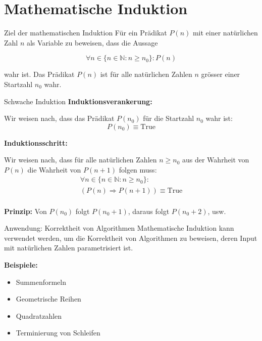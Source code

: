 \documentclass[a4paper, fontsize=7pt]{scrartcl}
\begin{document}
\section{Mathematische Induktion}

\begin{mainbox}{Ziel der mathematischen Induktion}
Für ein Prädikat $P(n)$ mit einer natürlichen Zahl $n$ als Variable zu beweisen, dass die Aussage

$$\forall n \in \{n \in \mathbb{N} : n \geq n_0\} : P(n)$$

wahr ist. Das Prädikat $P(n)$ ist für alle natürlichen Zahlen $n$ grösser einer Startzahl $n_0$ wahr.
\end{mainbox}

\begin{mainbox}{Schwache Induktion}
\textbf{Induktionsverankerung:}

Wir weisen nach, dass das Prädikat $P(n_0)$ für die Startzahl $n_0$ wahr ist:
$$P(n_0) \equiv \text{True}$$

\textbf{Induktionsschritt:}

Wir weisen nach, dass für alle natürlichen Zahlen $n \geq n_0$ aus der Wahrheit von $P(n)$ die Wahrheit von $P(n+1)$ folgen muss:
\begin{gather*}
    \forall n \in \{n \in \mathbb{N} : n \geq n_0\} :\\
    (P(n) \Rightarrow P(n+1)) \equiv \text{True}\\
\end{gather*}

\textbf{Prinzip:} Von $P(n_0)$ folgt $P(n_0+1)$, daraus folgt $P(n_0+2)$, usw.
\end{mainbox}

\begin{subbox}{Anwendung: Korrektheit von Algorithmen}
Mathematische Induktion kann verwendet werden, um die Korrektheit von Algorithmen zu beweisen, deren Input mit natürlichen Zahlen parametrisiert ist.

\textbf{Beispiele:}
\begin{itemize}
    \item Summenformeln
    \item Geometrische Reihen
    \item Quadratzahlen
    \item Terminierung von Schleifen
\end{itemize}
\end{subbox}
\end{document}
